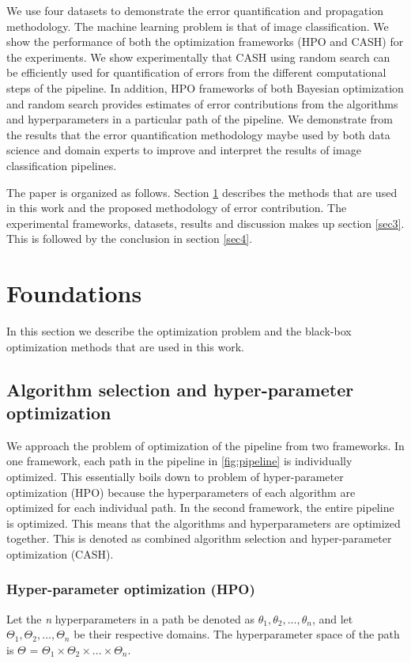 We use four datasets to demonstrate the error quantification and propagation methodology. The machine learning problem is that of image classification. We show the performance of both the optimization frameworks (HPO and CASH) for the experiments. We show experimentally that CASH using random search can be efficiently used for quantification of errors from the different computational steps of the pipeline. In addition, HPO frameworks of both Bayesian optimization and random search provides  estimates of error contributions from the algorithms and hyperparameters in a particular path of the pipeline.
We demonstrate from the results that the error quantification methodology maybe used by both data science and domain experts to improve and interpret the results of image classification pipelines.  

The paper is organized as follows. Section \ref{sec2} describes the methods that are used in this work and the proposed methodology of error contribution. The experimental frameworks, datasets, results and discussion makes up section \ref{sec3}. This is followed by the conclusion in section \ref{sec4}.

\section{Foundations}
\label{sec2}
In this section we describe the optimization problem and the black-box optimization methods that are used in this work. 
\subsection{Algorithm selection and hyper-parameter optimization}
\label{subsec_AS_HPO}
We approach the problem of optimization of the pipeline from two frameworks. In one framework, each path in the pipeline in \ref{fig:pipeline} is individually optimized. This essentially boils down to problem of hyper-parameter optimization (HPO)  because the hyperparameters of each algorithm are optimized for each individual path. In the second framework, the entire pipeline is optimized. This means that the algorithms and hyperparameters are optimized together. This is denoted as combined algorithm selection and hyper-parameter optimization (CASH).

\subsubsection{Hyper-parameter optimization (HPO)}
\label{subsubsec_HPO}
Let the \textit{n} hyperparameters in a path be denoted as $\theta_1, \theta_2, ..., \theta_n$, and let $\Theta_1, \Theta_2, ..., \Theta_n$ be their respective domains. The hyperparameter space of the path is  \textbf{$\Theta$} = $\Theta_1 \times \Theta_2 \times ... \times \Theta_n$.


